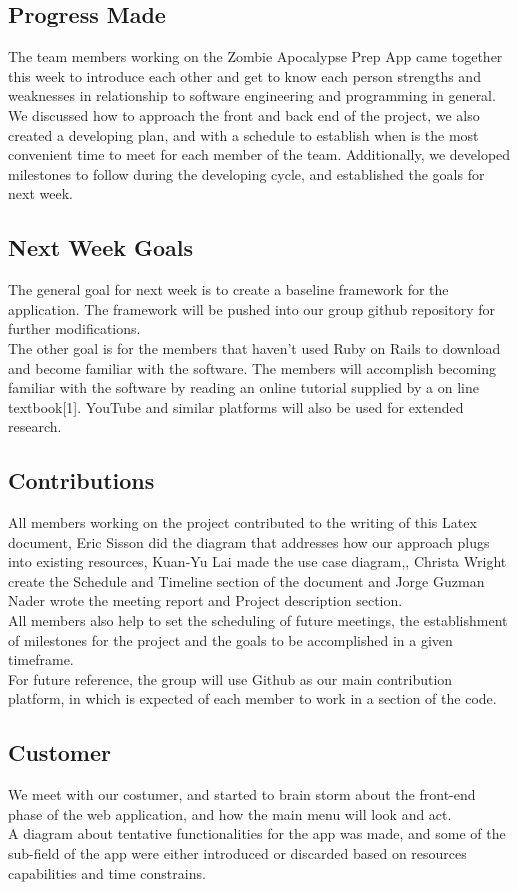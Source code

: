 \documentclass[a4paper]{article}
\begin{document}
\subsection{Progress Made} 
The team members working on the Zombie Apocalypse Prep App came together this week to introduce each other and get to know each person strengths and weaknesses in relationship to software engineering and programming in general.\\ We discussed how to approach the front and back end of the project, we also created a developing plan, and with a schedule to establish when is the most convenient time to meet for each member of the team.
Additionally, we developed milestones to follow during the developing cycle, and established the goals for next week.
\\
\subsection{Next Week Goals} 
The general goal for next week is to create a baseline framework for the application. The framework will be pushed into our group github repository for further modifications.\\ The other goal is for the members that haven't used Ruby on Rails to download and become familiar with the software. The members will accomplish becoming familiar with the software by reading an online tutorial supplied by a on line textbook[1]. YouTube and similar platforms will also be used for extended research. 
\\
\subsection{Contributions} 
All members working on the project contributed to the writing of this Latex document, Eric Sisson did the diagram that addresses how our approach plugs into existing resources, Kuan-Yu Lai made the use case diagram,, Christa Wright create the Schedule and Timeline section of the document and Jorge Guzman Nader wrote the meeting report and Project description section.\\ All members also help to set the scheduling of future meetings, the establishment of milestones for the project and the goals to be accomplished in a given timeframe.\\ For future reference, the group will use Github as our main contribution platform, in which is expected of each member to work in a section of the code.
\\
\subsection{Customer} 
We meet with our costumer, and started to brain storm about the front-end phase of the web application, and how the main menu will look and act.\\ A diagram about tentative functionalities for the app was made, and some of the sub-field of the app were either introduced or discarded based on resources capabilities and time constrains. 
\\
\end{document}
